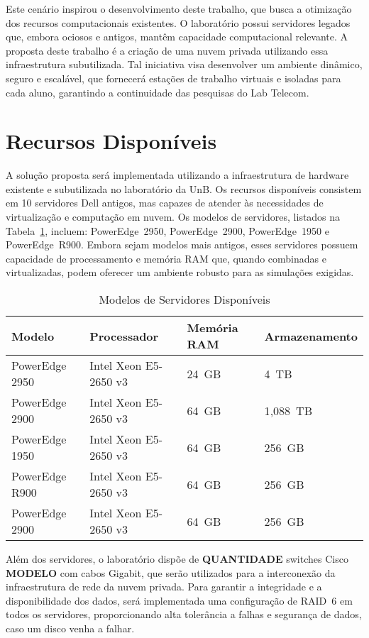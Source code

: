 Este cenário inspirou o desenvolvimento deste trabalho, que busca a otimização dos recursos computacionais existentes. O laboratório possui servidores legados que, embora ociosos e antigos, mantêm capacidade computacional relevante. A proposta deste trabalho é a criação de uma nuvem privada utilizando essa infraestrutura subutilizada. Tal iniciativa visa desenvolver um ambiente dinâmico, seguro e escalável, que fornecerá estações de trabalho virtuais e isoladas para cada aluno, garantindo a continuidade das pesquisas do Lab Telecom.

\section{Recursos Disponíveis}

A solução proposta será implementada utilizando a infraestrutura de hardware existente e subutilizada no laboratório da UnB. Os recursos disponíveis consistem em 10 servidores Dell antigos, mas capazes de atender às necessidades de virtualização e computação em nuvem. Os modelos de servidores, listados na Tabela~\ref{tab:servidores}, incluem: PowerEdge~2950, PowerEdge~2900, PowerEdge~1950 e PowerEdge~R900. Embora sejam modelos mais antigos, esses servidores possuem capacidade de processamento e memória RAM que, quando combinadas e virtualizadas, podem oferecer um ambiente robusto para as simulações exigidas.

\begin{table}[htb]
\centering
\caption{Modelos de Servidores Disponíveis}
\label{tab:servidores}
\begin{tabular}{l l l l}
\toprule
Modelo & Processador & Memória RAM & Armazenamento\\ \midrule
PowerEdge 2950 & Intel Xeon E5-2650 v3 & 24~GB & 4~TB \\
PowerEdge 2900 & Intel Xeon E5-2650 v3 & 64~GB & 1{,}088~TB \\
PowerEdge 1950 & Intel Xeon E5-2650 v3 & 64~GB & 256~GB \\
PowerEdge R900 & Intel Xeon E5-2650 v3 & 64~GB & 256~GB \\
PowerEdge 2900 & Intel Xeon E5-2650 v3 & 64~GB & 256~GB \\
\bottomrule
\end{tabular}
\end{table}

Além dos servidores, o laboratório dispõe de \textbf{QUANTIDADE} switches Cisco \textbf{MODELO} com cabos Gigabit, que serão utilizados para a interconexão da infraestrutura de rede da nuvem privada. Para garantir a integridade e a disponibilidade dos dados, será implementada uma configuração de RAID~6 em todos os servidores, proporcionando alta tolerância a falhas e segurança de dados, caso um disco venha a falhar.

